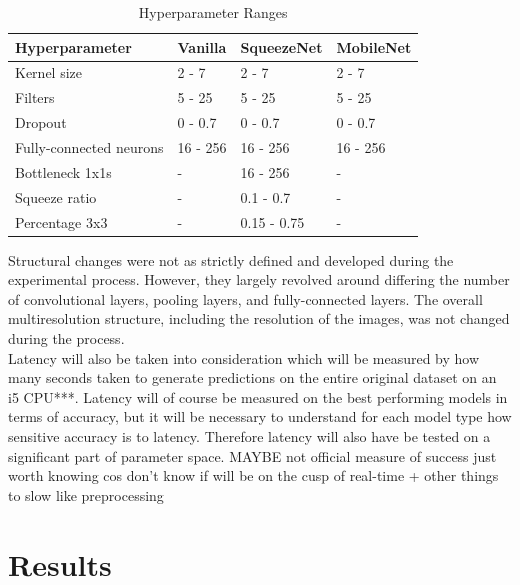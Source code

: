 \documentclass{article}
\begin{document}
\begin{table}[h!]
  \begin{center}
    \caption{Hyperparameter Ranges}
    \label{tab:table1}
    \begin{tabular}{l|l|l|l}
      \textbf{Hyperparameter} & \textbf{Vanilla} &                          \textbf{SqueezeNet} & \textbf{MobileNet}\\
      \hline
      Kernel size & 2 - 7 & 2 - 7 & 2 - 7\\
      Filters & 5 - 25 & 5 - 25 & 5 - 25\\
      Dropout & 0 - 0.7 & 0 - 0.7 & 0 - 0.7\\
      Fully-connected neurons & 16 - 256 & 16 - 256 & 16 - 256\\
      Bottleneck 1x1s & - & 16 - 256 & - \\
      Squeeze ratio & - & 0.1 - 0.7 & - \\
      Percentage 3x3 & - & 0.15 - 0.75 & - \\
    \end{tabular}
  \end{center}
\end{table}

Structural changes were not as strictly defined and developed during the experimental process. However, they largely revolved around differing the number of convolutional layers, pooling layers, and fully-connected layers. The overall multiresolution structure, including the resolution of the images, was not changed during the process. \\

Latency will also be taken into consideration which will be measured by how many seconds taken to generate predictions on the entire original dataset on an i5 CPU***. Latency will of course be measured on the best performing models in terms of accuracy, but it will be necessary to understand for each model type how sensitive accuracy is to latency. Therefore latency will also have be tested on a significant part of parameter space. MAYBE not official measure of success just worth knowing cos don't know if will be on the cusp of real-time + other things to slow like preprocessing\\

\section{Results}
\end{document}
